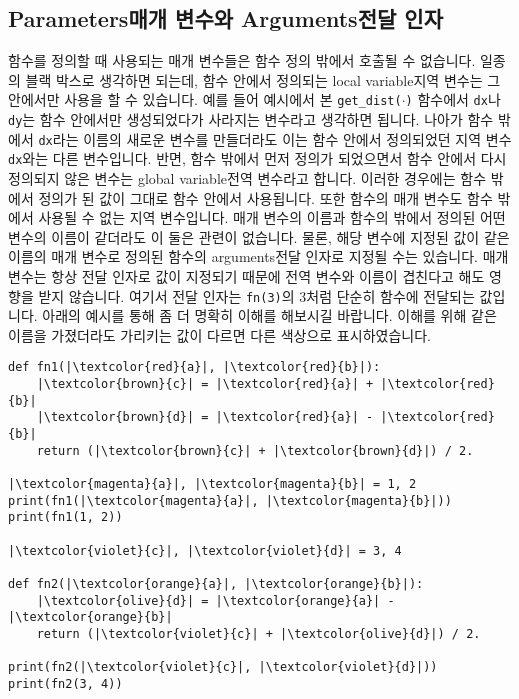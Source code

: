 \documentclass[../main.tex]{subfiles}
\begin{document}
\subsection{Parameters매개 변수와 Arguments전달 인자}
함수를 정의할 때 사용되는 매개 변수들은 함수 정의 밖에서 호출될 수 없습니다.
일종의 블랙 박스로 생각하면 되는데, 함수 안에서 정의되는 local variable지역
변수는 그 안에서만 사용을 할 수 있습니다.  예를 들어 예시에서 본
\texttt{get\_dist($\cdot$)} 함수에서 \texttt{dx}나 \texttt{dy}는 함수 안에서만
생성되었다가 사라지는 변수라고 생각하면 됩니다.  나아가 함수 밖에서
\texttt{dx}라는 이름의 새로운 변수를 만들더라도 이는 함수 안에서 정의되었던
지역 변수 \texttt{dx}와는 다른 변수입니다.  반면, 함수 밖에서 먼저 정의가
되었으면서 함수 안에서 다시 정의되지 않은 변수는 global variable전역 변수라고
합니다.  이러한 경우에는 함수 밖에서 정의가 된 값이 그대로 함수 안에서
사용됩니다.  또한 함수의 매개 변수도 함수 밖에서 사용될 수 없는 지역
변수입니다.  매개 변수의 이름과 함수의 밖에서 정의된 어떤 변수의 이름이
같더라도 이 둘은 관련이 없습니다.  물론, 해당 변수에 지정된 값이 같은 이름의
매개 변수로 정의된 함수의 arguments전달 인자로 지정될 수는 있습니다.  매개
변수는 항상 전달 인자로 값이 지정되기 때문에 전역 변수와 이름이 겹친다고 해도
영향을 받지 않습니다.  여기서 전달 인자는 \texttt{fn(3)}의 3처럼 단순히 함수에
전달되는 값입니다.  아래의 예시를 통해 좀 더 명확히 이해를 해보시길 바랍니다.
이해를 위해 같은 이름을 가졌더라도 가리키는 값이 다르면 다른 색상으로
표시하였습니다.
\begin{verbatim}
def fn1(|\textcolor{red}{a}|, |\textcolor{red}{b}|):
    |\textcolor{brown}{c}| = |\textcolor{red}{a}| + |\textcolor{red}{b}|
    |\textcolor{brown}{d}| = |\textcolor{red}{a}| - |\textcolor{red}{b}|
    return (|\textcolor{brown}{c}| + |\textcolor{brown}{d}|) / 2.

|\textcolor{magenta}{a}|, |\textcolor{magenta}{b}| = 1, 2
print(fn1(|\textcolor{magenta}{a}|, |\textcolor{magenta}{b}|))
print(fn1(1, 2))

|\textcolor{violet}{c}|, |\textcolor{violet}{d}| = 3, 4

def fn2(|\textcolor{orange}{a}|, |\textcolor{orange}{b}|):
    |\textcolor{olive}{d}| = |\textcolor{orange}{a}| - |\textcolor{orange}{b}|
    return (|\textcolor{violet}{c}| + |\textcolor{olive}{d}|) / 2.

print(fn2(|\textcolor{violet}{c}|, |\textcolor{violet}{d}|))
print(fn2(3, 4))
\end{verbatim}
\end{document}
